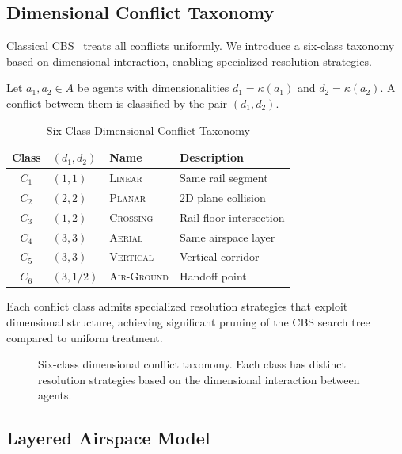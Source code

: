 \subsection{Dimensional Conflict Taxonomy}

Classical CBS~\cite{sharon2015cbs} treats all conflicts uniformly. We introduce a six-class taxonomy based on dimensional interaction, enabling specialized resolution strategies.

\begin{definition}
Let $a_1, a_2 \in A$ be agents with dimensionalities $d_1 = \kappa(a_1)$ and $d_2 = \kappa(a_2)$. A conflict between them is classified by the pair $(d_1, d_2)$.
\end{definition}

\begin{table}[htbp]
\centering
\caption{Six-Class Dimensional Conflict Taxonomy}
\label{tab:conflicts}
\begin{tabular}{@{}clll@{}}
\toprule
Class & $(d_1, d_2)$ & Name & Description \\
\midrule
$C_1$ & $(1, 1)$ & \textsc{Linear} & Same rail segment \\
$C_2$ & $(2, 2)$ & \textsc{Planar} & 2D plane collision \\
$C_3$ & $(1, 2)$ & \textsc{Crossing} & Rail-floor intersection \\
$C_4$ & $(3, 3)$ & \textsc{Aerial} & Same airspace layer \\
$C_5$ & $(3, 3)$ & \textsc{Vertical} & Vertical corridor \\
$C_6$ & $(3, 1/2)$ & \textsc{Air-Ground} & Handoff point \\
\bottomrule
\end{tabular}
\end{table}

Each conflict class admits specialized resolution strategies that exploit dimensional structure, achieving significant pruning of the CBS search tree compared to uniform treatment.

\begin{figure}[htbp]
\centering

\caption{Six-class dimensional conflict taxonomy. Each class has distinct resolution strategies based on the dimensional interaction between agents.}
\label{fig:conflicts}
\end{figure}

\subsection{Layered Airspace Model}

